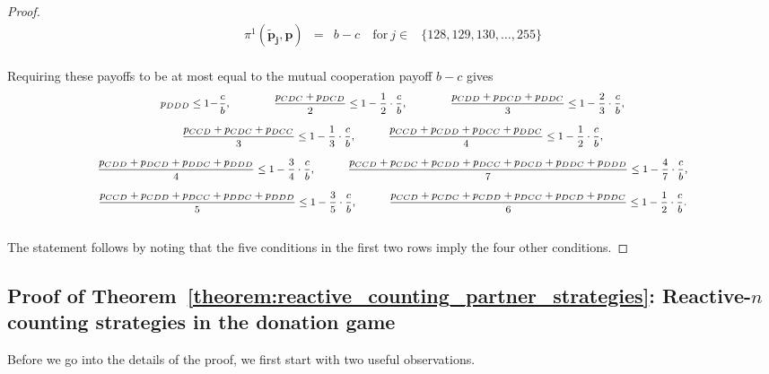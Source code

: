 \documentclass[9pt,twoside,lineno]{pnas-new}
\theoremstyle{plainCl1}
\theoremstyle{plainCl2}
\begin{document}
\begin{proof}
\begin{equation*}
\begin{array}{lclll}
\pi^1(\mathbf{\tilde p_j},\mathbf{p}) &= 
&\displaystyle b - c 
&~\text{for}~ j\! \in\! 
& \{128, 129, 130, \dots, 255\}
\end{array}
\end{equation*}
~\\
\noindent
Requiring these payoffs to be at most  equal to the mutual cooperation payoff $b\!-\!c$
gives
\begin{equation*} \footnotesize
\begin{array}{c}
\displaystyle  p_{DDD} \leq 1 \!- \!\frac{c}{b}, 
  \qquad \qquad \frac{p_{CDC} + p_{DCD}}{2} \leq 1 - \frac{1}{2} \cdot \frac{c}{b}, 
  \qquad \qquad \frac{p_{CDD} + p_{DCD} + p_{DDC}}{3} \leq 1 - \frac{2}{3} \cdot \frac{c}{b},\\[0.45cm]
\displaystyle  \frac{p_{CCD} + p_{CDC} + p_{DCC}}{3} \leq 1 - \frac{1}{3} \cdot \frac{c}{b},
  \quad \qquad \frac{p_{CCD} + p_{CDD} + p_{DCC} + p_{DDC}}{4} \leq 1 - \frac{1}{2}  \cdot \frac{c}{b}, \\[0.45cm]
\displaystyle  \frac{p_{CDD} + p_{DCD} + p_{DDC} + p_{DDD}}{4} \leq 1 - \frac{3}{4} \cdot \frac{c}{b}, 
  \quad \qquad \frac{p_{CCD} + p_{CDC} + p_{CDD} + p_{DCC} + p_{DCD} + p_{DDC} + p_{DDD}}{7} \leq 1 - \frac{4}{7} \cdot \frac{c}{b}, \\[0.45cm]
\displaystyle  \frac{p_{CCD} + p_{CDD} + p_{DCC} + p_{DDC} + p_{DDD}}{5} \leq 1 - \frac{3}{5} \cdot \frac{c}{b},
  \quad \qquad \frac{p_{CCD} + p_{CDC} + p_{CDD} + p_{DCC} + p_{DCD} + p_{DDC}}{6} \leq 1 - \frac{1}{2} \cdot \frac{c}{b}.
  \end{array}
\end{equation*}
~\\
The statement follows by noting that the five conditions in the first two rows imply the four other conditions.
\end{proof}





\subsection{Proof of Theorem~\ref{theorem:reactive_counting_partner_strategies}: Reactive-$n$ counting strategies in the donation game}

Before we go into the details of the proof, we first start with two useful observations.
\end{document}

